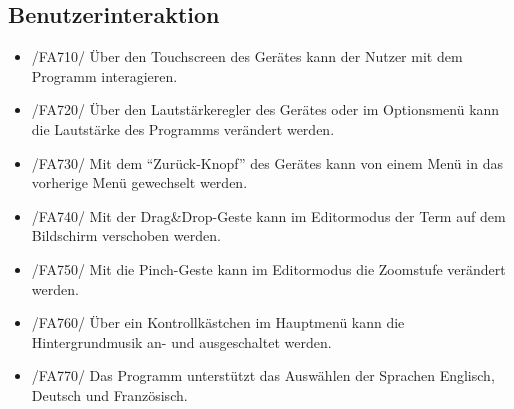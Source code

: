 \subsection{Benutzerinteraktion}

\begin{itemize}
\item /FA710/ Über den Touchscreen des Gerätes kann der Nutzer mit dem Programm interagieren.
\item /FA720/ Über den Lautstärkeregler des Gerätes oder im Optionsmenü kann die Lautstärke des Programms verändert werden.
\item /FA730/ Mit dem "`Zurück-Knopf"' des Gerätes kann von einem Menü in das vorherige Menü gewechselt werden.
\item /FA740/ Mit der Drag\&Drop-Geste kann im Editormodus der Term auf dem Bildschirm verschoben werden.
\item /FA750/ Mit die Pinch-Geste kann im Editormodus die Zoomstufe verändert werden.
\item /FA760/ Über ein Kontrollkästchen im Hauptmenü kann die Hintergrundmusik an- und ausgeschaltet werden.
\item /FA770/ Das Programm unterstützt das Auswählen der Sprachen Englisch, Deutsch und Französisch.
\end{itemize}
